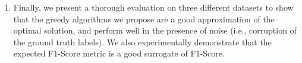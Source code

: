 \begin{enumerate}
\item Finally, we present a thorough evaluation on three different datasets to show that the greedy algorithms we propose are a good approximation of the optimal solution, and perform well in the presence of noise (i.e., corruption of the ground truth labels).
We also experimentally demonstrate that the expected F1-Score metric is a good surrogate of F1-Score.
\end{enumerate}




